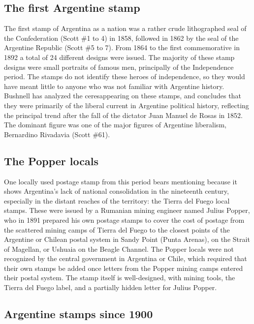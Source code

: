 \subsection{The first Argentine stamp}

The first stamp of Argentina as a nation was a rather crude lithographed seal of the Confederation (Scott \#1 to 4) in 1858, followed in 1862 by the seal of the Argentine Republic (Scott \#5 to 7). From 1864 to the first commemorative in 1892 a total of 24 different designs were issued. The majority of these stamp designs were small portraits of famous men, principally of the Independence period. The stamps do not identify these heroes of independence, so they would have meant little to anyone who was not familiar with Argentine history. Bushnell has analyzed the ceresappearing on these stamps, and concludes that they were primarily of the liberal current in Argentine political history, reflecting the principal trend after the fall of the dictator Juan Manuel de Rosas in 1852. The dominant figure was one of the major figures of Argentine liberalism, Bernardino Rivadavia (Scott \#61).

\subsection{The Popper locals}


One locally used postage stamp from this period bears mentioning because it shows Argentina's lack of national consolidation in the nineteenth century, especially in the distant reaches of the territory: the Tierra del Fuego local stamps. These were issued by a Rumanian mining engineer named Julius Popper, who in 1891 prepared his own postage stamps to cover the cost of postage from the scattered mining camps of Tierra del Fuego to the closest points of the Argentine or Chilean postal system in Sandy Point (Punta Arenas), on the Strait of Magellan, or Ushuaia on the Beagle Channel. The Popper locals were not recognized by the central government in Argentina or Chile, which required that their own stamps be added once letters from the Popper mining camps entered their postal system. The stamp itself is well-designed, with mining tools, the Tierra del Fuego label, and a partially hidden letter  for Julius Popper.

\subsection{Argentine stamps since 1900}

